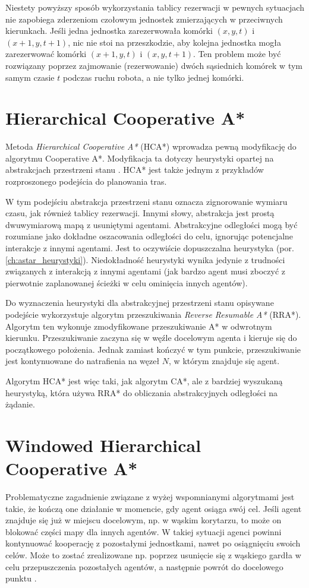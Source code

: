 Niestety powyższy sposób wykorzystania tablicy rezerwacji w pewnych sytuacjach nie zapobiega zderzeniom czołowym jednostek zmierzających w przeciwnych kierunkach.
Jeśli jedna jednostka zarezerwowała komórki $(x, y, t)$ i $(x + 1, y, t + 1)$, nic nie stoi na przeszkodzie, aby kolejna jednostka mogła zarezerwować komórki $(x + 1, y, t)$ i $(x, y, t + 1)$. Ten problem może być rozwiązany poprzez zajmowanie (rezerwowanie) dwóch sąsiednich komórek w tym samym czasie $t$ podczas ruchu robota, a nie tylko jednej komórki.

\section{Hierarchical Cooperative A*}
\label{ch:hier_cooperative_a}
Metoda {\it Hierarchical Cooperative A*} (HCA*) wprowadza pewną modyfikację do algorytmu Cooperative A*. Modyfikacja ta dotyczy heurystyki opartej na abstrakcjach przestrzeni stanu \cite{cooppath}.
HCA* jest także jednym z przykładów rozproszonego podejścia do planowania tras.

W tym podejściu abstrakcja przestrzeni stanu oznacza zignorowanie wymiaru czasu, jak również tablicy rezerwacji.
Innymi słowy, abstrakcja jest prostą dwuwymiarową mapą z usuniętymi agentami. Abstrakcyjne odległości mogą być rozumiane jako dokładne oszacowania odległości do celu, ignorując potencjalne interakcje z innymi agentami. Jest to oczywiście dopuszczalna heurystyka (por. \ref{ch:astar_heurystyki}). Niedokładność heurystyki wynika jedynie z trudności związanych z interakcją z innymi agentami (jak bardzo agent musi zboczyć z pierwotnie zaplanowanej ścieżki w celu ominięcia innych agentów).

Do wyznaczenia heurystyki dla abstrakcyjnej przestrzeni stanu opisywane podejście wykorzystuje algorytm przeszukiwania {\it Reverse Resumable A*} (RRA*).
Algorytm ten wykonuje zmodyfikowane przeszukiwanie A* w odwrotnym kierunku. Przeszukiwanie zaczyna się w węźle docelowym agenta i kieruje się do początkowego położenia. Jednak zamiast kończyć w tym punkcie, przeszukiwanie jest kontynuowane do natrafienia na węzeł $N$, w którym znajduje się agent.

Algorytm HCA* jest więc taki, jak algorytm CA*, ale z bardziej wyszukaną heurystyką, która używa RRA* do obliczania abstrakcyjnych odległości na żądanie.

\section{Windowed Hierarchical Cooperative A*}
\label{ch:whca}
Problematyczne zagadnienie związane z wyżej wspomnianymi algorytmami jest takie, że kończą one działanie w momencie, gdy agent osiąga swój cel. Jeśli agent znajduje się już w miejscu docelowym, np. w wąskim korytarzu, to może on blokować części mapy dla innych agentów. W takiej sytuacji agenci powinni kontynuować kooperację z pozostałymi jednostkami, nawet po osiągnięciu swoich celów. Może to zostać zrealizowane np. poprzez usunięcie się z wąskiego gardła w celu przepuszczenia pozostałych agentów, a następnie powrót do docelowego punktu \cite{cooppath}.

